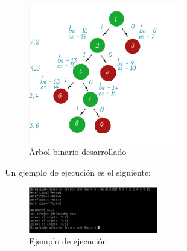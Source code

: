 \documentclass[10pt,a4paper,spanish]{report}
\theoremstyle{definition}
\theoremstyle{remark}
\begin{document}
\begin{center}
\begin{figure}[!h]
\centering
\includegraphics[width=0.6\textwidth]{figura5}
\caption{Árbol binario desarrollado}
\label{figura5}
\end{figure}
\end{center}


Un ejemplo de ejecución es el siguiente:

\begin{center}
\begin{figure}[!h]
\centering
\includegraphics[width=0.5\textwidth]{figura6}
\caption{Ejemplo de ejecución}
\label{figura6}
\end{figure}
\end{center}
\end{document}
